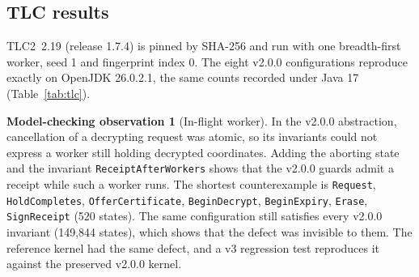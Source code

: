 \documentclass[pdflatex,sn-mathphys-num]{sn-jnl}
\theoremstyle{plain}
\theoremstyle{definition}
\newtheorem{observation}{Model-checking observation}
\newcommand{\code}[1]{\texttt{#1}}
\begin{document}
\subsection{TLC results}
TLC2~2.19 (release 1.7.4) is pinned by SHA-256 and run with one breadth-first worker, seed 1 and fingerprint index 0. The eight v2.0.0 configurations reproduce exactly on OpenJDK 26.0.2.1, the same counts recorded under Java 17 (Table~\ref{tab:tlc}).

\begin{observation}[In-flight worker]\label{obs:inflight}
In the v2.0.0 abstraction, cancellation of a decrypting request was atomic, so its invariants could not express a worker still holding decrypted coordinates. Adding the aborting state and the invariant \code{ReceiptAfterWorkers} shows that the v2.0.0 guards admit a receipt while such a worker runs. The shortest counterexample is \code{Request}, \code{HoldCompletes}, \code{OfferCertificate}, \code{BeginDecrypt}, \code{BeginExpiry}, \code{Erase}, \code{SignReceipt} (520 states). The same configuration still satisfies every v2.0.0 invariant (149,844 states), which shows that the defect was invisible to them. The reference kernel had the same defect, and a v3 regression test reproduces it against the preserved v2.0.0 kernel.
\end{observation}
\end{document}
